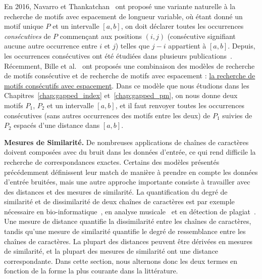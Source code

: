 En 2016, Navarro et Thankatchan~\cite{NAVARRO2016108} ont proposé une variante naturelle à la recherche de motifs avec espacement de longueur variable, où étant donné un motif unique $P$ et un intervalle $[a,b]$, on doit déclarer toutes les occurrences \emph{consécutives} de $P$ commençant aux positions $(i,j)$ (consécutive signifiant aucune autre occurrence entre $i$ et $j$) telles que $j-i$ appartient à $[a,b]$. Depuis, les occurrences consécutives ont été étudiées dans plusieurs publications~\cite{DBLP:conf/fsttcs/BilleGPRS20,DBLP:journals/corr/abs-2304-00887,DBLP:journals/corr/abs-2211-16860}.
Récemment, Bille et al.~\cite{bille2022gapped} ont proposés une combinaison des modèles de recherche de motifs consécutive et de recherche de motifs avec espacement : \underline{la recherche de motifs consécutifs avec espacement}.
Dans ce modèle que nous étudions dans les Chapitres~\ref*{chap:gapped_index} et~\ref*{chap:gapped_pm}, on nous donne deux motifs $P_1$, $P_2$ et un intervalle $[a, b]$, et il faut renvoyer toutes les occurrences consécutives (sans autres occurrences des motifs entre les deux) de $P_1$ suivies  de $P_2$ espacés d'une distance dans $[a, b]$. 



\noindent\textbf{Mesures de Similarité.} 
De nombreuses applications de chaînes de caractères doivent composées avec du bruit dans les données d'entrée, ce qui rend difficile la recherche de correspondances exactes. Certains des modèles présentés précédemment définissent leur match de manière à prendre en compte les données d'entrée bruitées, mais une autre approche importante consiste à travailler avec des distances et des mesures de similarité. La quantification du degré de similarité et de dissimilarité de deux chaînes de caractères est par exemple nécessaire en bio-informatique~\cite{Gusfield1997}, en analyse musicale~\cite{Mongeau1990} et en détection de plagiat~\cite{lukashenko2007computer}. 
%
Une mesure de distance quantifie la dissimilarité entre les chaînes de caractères, tandis qu'une mesure de similarité quantifie le degré de ressemblance entre les chaînes de caractères. La plupart des distances peuvent être dérivées en mesures de similarité, et la plupart des mesures de similarité ont une distance correspondante. Dans cette section, nous alternons donc les deux termes en fonction de la forme la plus courante dans la littérature.

